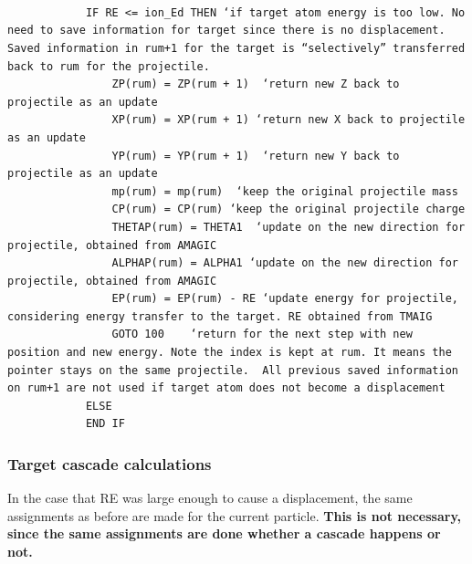 \documentclass[10pt, reqno]{exam}
\begin{document}
\begin{verbatim}   

    
    
            IF RE <= ion_Ed THEN ‘if target atom energy is too low. No need to save information for target since there is no displacement. Saved information in rum+1 for the target is “selectively” transferred back to rum for the projectile.  
                ZP(rum) = ZP(rum + 1)  ‘return new Z back to projectile as an update
                XP(rum) = XP(rum + 1) ‘return new X back to projectile as an update
                YP(rum) = YP(rum + 1)  ‘return new Y back to projectile as an update
                mp(rum) = mp(rum)  ‘keep the original projectile mass
                CP(rum) = CP(rum) ‘keep the original projectile charge
                THETAP(rum) = THETA1  ‘update on the new direction for projectile, obtained from AMAGIC
                ALPHAP(rum) = ALPHA1 ‘update on the new direction for projectile, obtained from AMAGIC
                EP(rum) = EP(rum) - RE ‘update energy for projectile, considering energy transfer to the target. RE obtained from TMAIG
                GOTO 100    ‘return for the next step with new position and new energy. Note the index is kept at rum. It means the pointer stays on the same projectile.  All previous saved information on rum+1 are not used if target atom does not become a displacement
            ELSE
            END IF
\end{verbatim}

\subsubsection{Target cascade calculations}

In the case that RE was large enough to cause a displacement, the same assignments as before are made for the current particle. \textbf{This is not necessary, since the same assignments are done whether a cascade happens or not.}
\end{document}
